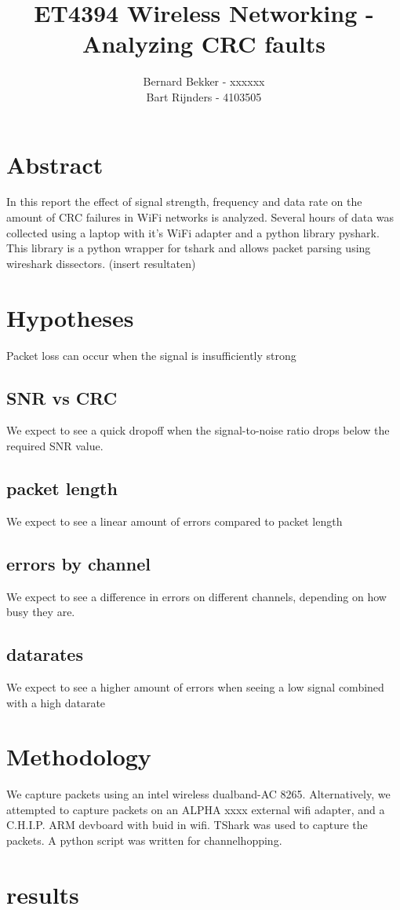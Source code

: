 \documentclass{article}
\title{ET4394 Wireless Networking - Analyzing CRC faults}
\date{}
\author{
Bernard Bekker - xxxxxx \\
Bart Rijnders - 4103505
}
\begin{document}
\maketitle

\section{Abstract}

In this report the effect of signal strength, frequency and data rate on the amount of CRC failures in WiFi networks is analyzed. Several hours of data was collected using a laptop with it's WiFi adapter and a python library pyshark. This library is a python wrapper for tshark and allows packet parsing using wireshark dissectors. (insert resultaten)


\section{Hypotheses}

Packet loss can occur when the signal is insufficiently strong

\subsection{SNR vs CRC}

We expect to see a quick dropoff when the signal-to-noise ratio drops below the required SNR value.

\subsection{packet length}
We expect to see a linear amount of errors compared to packet length

\subsection{errors by channel}
We expect to see a difference in errors on different channels, depending on how busy they are.

\subsection{datarates}
We expect to see a higher amount of errors when seeing a low signal combined with a high datarate

\section{Methodology}

We capture packets using an intel wireless dualband-AC 8265. Alternatively, we attempted to capture packets on an ALPHA xxxx external wifi adapter, and a C.H.I.P. ARM devboard with buid in wifi.
TShark was used to capture the packets. A python script was written for channelhopping.


\section{results}

\printbibliography
\end{document}
